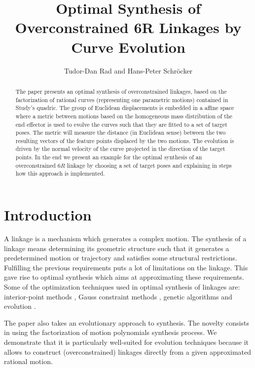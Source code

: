 \documentclass{scrartcl}
\title{Optimal Synthesis of Overconstrained 6R Linkages by Curve Evolution}
\author{Tudor-Dan Rad and Hans-Peter Schröcker}
\begin{document}
\maketitle

\begin{abstract}
  The paper presents an optimal synthesis of overconstrained linkages, based on the factorization of rational curves (representing one parametric motions) contained in Study's quadric. The group of Euclidean displacements is embedded in a affine space where a metric between motions based on the homogeneous mass distribution of the end effector is used to evolve the curves such that they are fitted to a set of target poses. The metric will measure the distance (in Euclidean sense) between the two resulting vectors of the feature points displaced by the two motions. The evolution is driven by the normal velocity of the curve projected in the direction of the target points. In the end we present an example for the optimal synthesis of an overconstrained $6R$ linkage by choosing a set of target poses and explaining in steps how this approach is implemented.
 \end{abstract}



\section{Introduction}

A linkage is a mechanism which generates a complex motion. The synthesis of a linkage means determining its geometric structure such that it generates a predetermined motion or trajectory and satisfies some structural restrictions. Fulfilling the previous requirements puts a lot of limitations on the linkage. This gave rise to optimal synthesis which aims at approximating these requirements. Some of the optimization techniques used in optimal synthesis of linkages are: interior-point methods \cite{journal zhang IPM}, Gauss constraint methods \cite{journal paradis GCM} , genetic algorithms \cite{journal Cabrera GA} and evolution \cite{contrib EB}.

The paper also takes an evolutionary approach to synthesis. The novelty consists in using the factorization of motion polynomials \cite{journal factorization RJ} synthesis process. We demonstrate that it is particularly well-suited for evolution techniques because it allows to construct (overconstrained) linkages directly from a given approximated rational motion.
\end{document}
